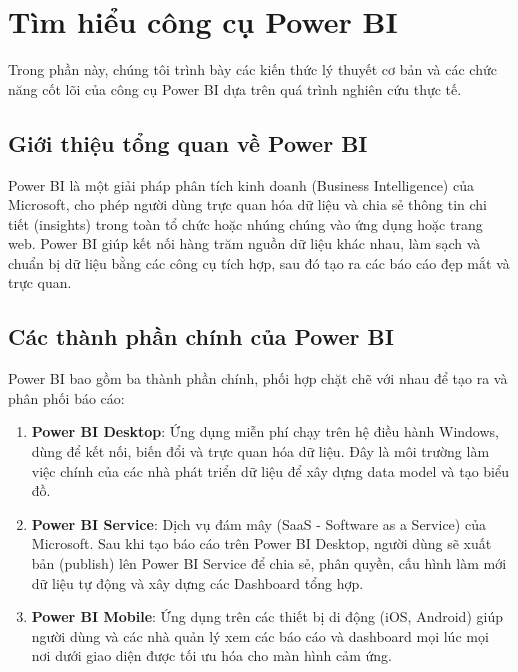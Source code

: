 \section{Tìm hiểu công cụ Power BI}
\label{sec:intro_pbi}

Trong phần này, chúng tôi trình bày các kiến thức lý thuyết cơ bản và các chức năng cốt lõi của công cụ Power BI dựa trên quá trình nghiên cứu thực tế.

\subsection{Giới thiệu tổng quan về Power BI}
Power BI là một giải pháp phân tích kinh doanh (Business Intelligence) của Microsoft, cho phép người dùng trực quan hóa dữ liệu và chia sẻ thông tin chi tiết (insights) trong toàn tổ chức hoặc nhúng chúng vào ứng dụng hoặc trang web. Power BI giúp kết nối hàng trăm nguồn dữ liệu khác nhau, làm sạch và chuẩn bị dữ liệu bằng các công cụ tích hợp, sau đó tạo ra các báo cáo đẹp mắt và trực quan.

\subsection{Các thành phần chính của Power BI}
Power BI bao gồm ba thành phần chính, phối hợp chặt chẽ với nhau để tạo ra và phân phối báo cáo:
\begin{enumerate}
    \item \textbf{Power BI Desktop}: Ứng dụng miễn phí chạy trên hệ điều hành Windows, dùng để kết nối, biến đổi và trực quan hóa dữ liệu. Đây là môi trường làm việc chính của các nhà phát triển dữ liệu để xây dựng data model và tạo biểu đồ.
    \item \textbf{Power BI Service}: Dịch vụ đám mây (SaaS - Software as a Service) của Microsoft. Sau khi tạo báo cáo trên Power BI Desktop, người dùng sẽ xuất bản (publish) lên Power BI Service để chia sẻ, phân quyền, cấu hình làm mới dữ liệu tự động và xây dựng các Dashboard tổng hợp.
    \item \textbf{Power BI Mobile}: Ứng dụng trên các thiết bị di động (iOS, Android) giúp người dùng và các nhà quản lý xem các báo cáo và dashboard mọi lúc mọi nơi dưới giao diện được tối ưu hóa cho màn hình cảm ứng.
\end{enumerate}

